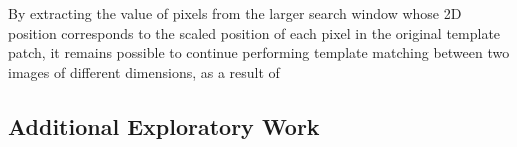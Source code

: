 By extracting the value of pixels from the larger search window whose 2D position corresponds to the scaled position of each pixel in the original template patch, it remains possible to continue performing template matching between two images of different dimensions, as a result of


\subsection{Additional Exploratory Work}





